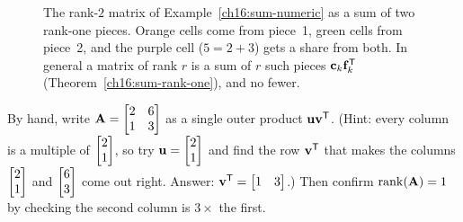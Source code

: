 \begin{figure}[htbp]
\caption{The rank-$2$ matrix of Example~\protect\ref{ch16:sum-numeric} as a sum of
two rank-one pieces. Orange cells come from piece~1, green cells from piece~2,
and the purple cell ($5 = 2 + 3$) gets a share from both. In general a matrix of
rank $r$ is a sum of $r$ such pieces $\protect\mathbf{c}_k\protect\mathbf{f}_k^{\mathsf{T}}$
(Theorem~\protect\ref{ch16:sum-rank-one}), and no fewer.}
\label{ch16:atomstack}
\end{figure}

\begin{labbox}
By hand, write $\mathbf{A}=\begin{bmatrix}2 & 6 \\ 1 & 3\end{bmatrix}$ as a single
outer product $\mathbf{u}\mathbf{v}^{\mathsf{T}}$. (Hint: every column is a multiple of
$\begin{bmatrix}2\\1\end{bmatrix}$, so try $\mathbf{u}=\begin{bmatrix}2\\1\end{bmatrix}$ and find the row $\mathbf{v}^{\mathsf{T}}$ that
makes the columns $\begin{bmatrix}2\\1\end{bmatrix}$ and $\begin{bmatrix}6\\3\end{bmatrix}$ come out right. Answer:
$\mathbf{v}^{\mathsf{T}} = \begin{bmatrix}1 & 3\end{bmatrix}$.) Then confirm $\operatorname{rank}(\mathbf{A})=1$
by checking the second column is $3\times$ the first.
\end{labbox}

